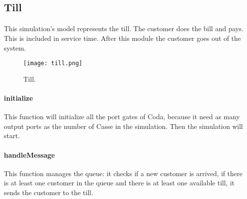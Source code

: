 \subsection{Till}
\paragraph{} This simulation's model represents the till. The customer does the bill and pays. This is included in service time. After this module the customer goes out of the system. 

\begin{figure}[h]
  \begin{center}
  \texttt{[image: till.png]}
  \caption{Till.}
  \label{fig:till}
  \end{center}
\end{figure}

\paragraph{initialize} This function will initialize all the port gates of Coda, because it need as many output ports as the number of Casse in the simulation. Then the simulation will start.

\paragraph{handleMessage} This function manages the queue: it checks if a new customer is arrived, if there is at least one customer in the queue and there is at least one available till, it sends the customer to the till.
